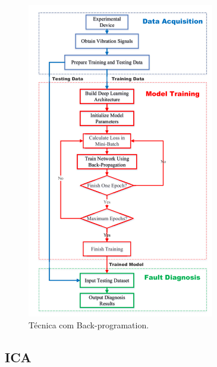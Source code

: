 \begin{figure}[H]
    \caption{Técnica com Back-programation.}
    \begin{center}
        \includegraphics[scale=.65]{referencial/img/back-programation-zhang-p5.png}
    \end{center}
    \label{fig:back-programation-zhang-p5}
\end{figure}


% 

\subsection{ICA}

